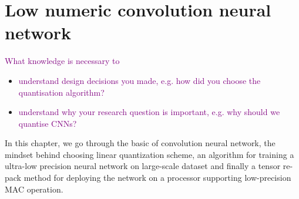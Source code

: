 \chapter{Low numeric convolution neural network}
\label{ch:low prec NN}
\textcolor{purple}{What knowledge is necessary to}
\begin{itemize}
    \item \textcolor{purple}{understand design decisions you made, e.g. how did you choose the quantisation algorithm?}
    \item \textcolor{purple}{understand why your research question is important, e.g. why should we quantise CNNs?}
\end{itemize}
In this chapter, we go through the basic of convolution neural network, the mindset behind choosing linear quantization scheme, an algorithm for training a ultra-low precision neural network on large-scale dataset and finally a tensor re-pack method for deploying the network on a processor supporting low-precision MAC operation.
